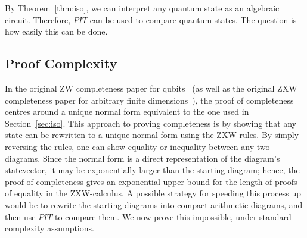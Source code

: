 By Theorem~\ref{thm:iso}, we can interpret any quantum state as an algebraic circuit. Therefore, $PIT$ can be used to compare quantum states. The question is how easily this can be done.

\subsection{Proof Complexity}

In the original ZW completeness paper for qubits~\cite{Hadzihasanovic2018zwzxcomplete} (as well as the original ZXW completeness paper for arbitrary finite dimensions~\cite{poor2023completeness}), the proof of completeness centres around a unique normal form equivalent to the one used in Section~\ref{sec:iso}. This approach to proving completeness is by showing that any state can be rewritten to a unique normal form using the ZXW rules. By simply reversing the rules, one can show equality or inequality between any two diagrams. Since the normal form is a direct representation of the diagram's statevector, it may be exponentially larger than the starting diagram; hence, the proof of completeness gives an exponential upper bound for the length of proofs of equality in the ZXW-calculus. A possible strategy for speeding this process up would be to rewrite the starting diagrams into compact arithmetic diagrams, and then use $PIT$ to compare them. We now prove this impossible, under standard complexity assumptions.

